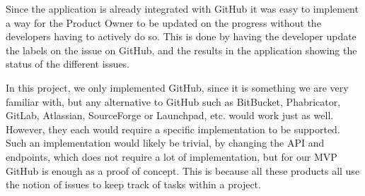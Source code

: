 Since the application is already integrated with GitHub it was easy to implement a way for the Product Owner to be updated on the progress without the developers having to actively do so.
This is done by having the developer update the labels on the issue on GitHub, and the results in the application showing the status of the different issues. 

In this project, we only implemented GitHub, since it is something we are very familiar with, but any alternative to GitHub such as BitBucket, Phabricator, GitLab, Atlassian, SourceForge or Launchpad, etc. would work just as well.
However, they each would require a specific implementation to be supported.
Such an implementation would likely be trivial, by changing the API and endpoints, which does not require a lot of implementation, but for our MVP GitHub is enough as a proof of concept.
This is because all these products all use the notion of issues to keep track of tasks within a project.
